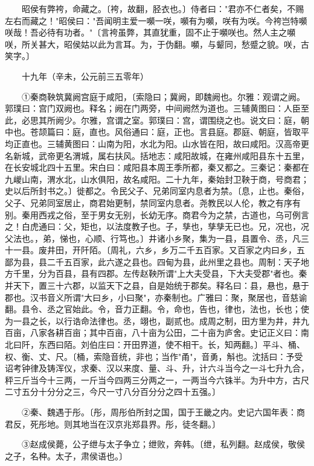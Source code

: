 　　昭侯有弊袴，命藏之。〔袴，故翻，胫衣也。〕侍者曰："君亦不仁者矣，不赐左右而藏之！"昭侯曰："吾闻明主爱一嚬一咲，嚬有为嚬，咲有为咲。今袴岂特嚬咲哉！吾必待有功者。"〔言袴虽弊，其直犹重，固不止于嚬咲也。然人主之嚬咲，所关甚大，昭侯姑以此为言耳。为，于伪翻。嚬，与颦同，愁蹙之貌。咲，古笑字。〕

　　十九年（辛未，公元前三五零年）

　　①秦商鞅筑冀阙宫庭于咸阳，〔索隐曰；冀阙，即魏阙也。尔雅：观谓之阙。郭璞曰：宫门双阙也。释名；阙在门两旁，中间阙然为道也。三辅黄图曰：人臣至此，必思其所阙少。尔雅，宫谓之室。郭璞曰：宫，谓围绕之也。说文曰：庭，朝中也。苍颉篇曰：庭，直也。风俗通曰：庭，正也。言县庭。郡庭、朝庭，皆取平均正直也。三辅黄图曰：山南为阳，水北为阳。山水皆在阳，故曰咸阳。汉高帝更名新城，武帝更名渭城，属右扶风。括地志：咸阳故城，在雍州咸阳县东十五里，在长安城北四十五里。宋白曰：咸阳县本周王季所都，秦又都之。三秦记：秦都在九嵕山南，渭水北，山水俱阳，故名咸阳。二十九年，秦始封卫鞅于商，号商君；史以后所封书之。〕徙都之。令民父子、兄弟同室内息者为禁。〔息，止也。秦俗，父子、兄弟同室居止，商君始更制，禁同室内息者。尧教民以人伦，教之有序有别。秦用西戎之俗，至于男女无别，长幼无序。商君今为之禁，古道也，乌可例言之！白虎通曰：父，矩也，以法度教子也。子，孳也，孳孳无已也。兄，况也，况父法也。，弟，悌也，心顺、行笃也。〕井诸小乡聚，集为一县，县置令、丞，凡三十一县。废井田，开阡陌。〔周礼，六乡，乡万二千五百家。又百家之内曰乡，五鄙为县，县二千五百家，此六遂之县也。四甸为县，此州里之县也。周制：天子地方千里，分为百县，县有四郡。左传赵鞅所谓"上大夫受县，下大夫受郡"者也。秦并天下，置三十六郡，以监天下之县，自是始统于郡矣。释名曰：县，悬也，悬于郡也。汉书音义所谓"大曰乡，小曰聚"，亦秦制也。广雅曰：聚，聚居也，音慈谕翻。县令、丞之官始此。令，音力正翻。令，命也，告也，律也，法也，长也；使为一县之长，以行诰命法律也。丞，翊也，副贰也。成周之制，田方里为井，井九百亩，八家各耕百亩；其中百亩，八十亩为公田，二十亩为庐舍。史记正义曰：南北曰阡，东西曰陌。刘伯庄曰：开田界道，使不相干。长，知两翻。〕平斗、桶、权、衡、丈、尺。〔桶，索隐音统，非也；当作"甬"，音勇，斛也。沈括曰：予受诏考钟律及铸浑仪，求秦、汉以来度、量、斗、升，计六斗当今之一斗七升九合，秤三斤当今十三两，一斤当今四两三分两之一，一两当今六铢半。为升中方，古尺二寸五分十分分之三，今尺一寸八分百分分之四十五强。〕

　　②秦、魏遇于彤。〔彤，周彤伯所封之国，国于王畿之内。史记六国年表：商君反，死彤地。则其地当在汉京兆郑县界。彤，徒冬翻。〕

　　③赵成侯薨，公子绁与太子争立；绁败，奔韩。〔绁，私列翻。赵成侯，敬侯之子，名种。太子，肃侯语也。〕

